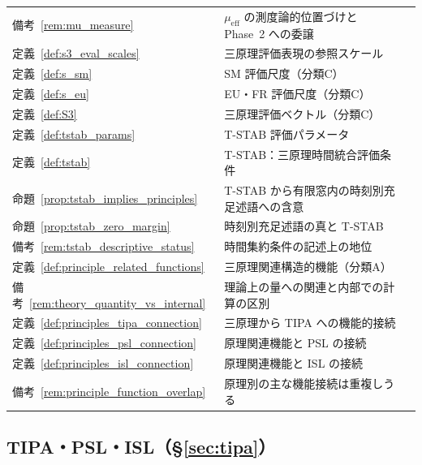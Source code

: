 \begin{longtable}{p{2.4cm} p{10.4cm} r}
備考~\ref{rem:mu_measure} & $\mu_{\mathrm{eff}}$ の測度論的位置づけと Phase~2 への委譲 & \pageref{rem:mu_measure} \\
定義~\ref{def:s3_eval_scales} & 三原理評価表現の参照スケール & \pageref{def:s3_eval_scales} \\
定義~\ref{def:s_sm} & SM 評価尺度（分類C） & \pageref{def:s_sm} \\
定義~\ref{def:s_eu} & EU・FR 評価尺度（分類C） & \pageref{def:s_eu} \\
定義~\ref{def:S3} & 三原理評価ベクトル（分類C） & \pageref{def:S3} \\
定義~\ref{def:tstab_params} & T-STAB 評価パラメータ & \pageref{def:tstab_params} \\
定義~\ref{def:tstab} & T-STAB：三原理時間統合評価条件 & \pageref{def:tstab} \\
命題~\ref{prop:tstab_implies_principles} & T-STAB から有限窓内の時刻別充足述語への含意 & \pageref{prop:tstab_implies_principles} \\
命題~\ref{prop:tstab_zero_margin} & 時刻別充足述語の真と T-STAB & \pageref{prop:tstab_zero_margin} \\
備考~\ref{rem:tstab_descriptive_status} & 時間集約条件の記述上の地位 & \pageref{rem:tstab_descriptive_status} \\
定義~\ref{def:principle_related_functions} & 三原理関連構造的機能（分類A） & \pageref{def:principle_related_functions} \\
備考~\ref{rem:theory_quantity_vs_internal} & 理論上の量への関連と内部での計算の区別 & \pageref{rem:theory_quantity_vs_internal} \\
定義~\ref{def:principles_tipa_connection} & 三原理から TIPA への機能的接続 & \pageref{def:principles_tipa_connection} \\
定義~\ref{def:principles_psl_connection} & 原理関連機能と PSL の接続 & \pageref{def:principles_psl_connection} \\
定義~\ref{def:principles_isl_connection} & 原理関連機能と ISL の接続 & \pageref{def:principles_isl_connection} \\
備考~\ref{rem:principle_function_overlap} & 原理別の主な機能接続は重複しうる & \pageref{rem:principle_function_overlap} \\
\end{longtable}
\endgroup

\subsection*{TIPA・PSL・ISL（\S\ref{sec:tipa}）}

